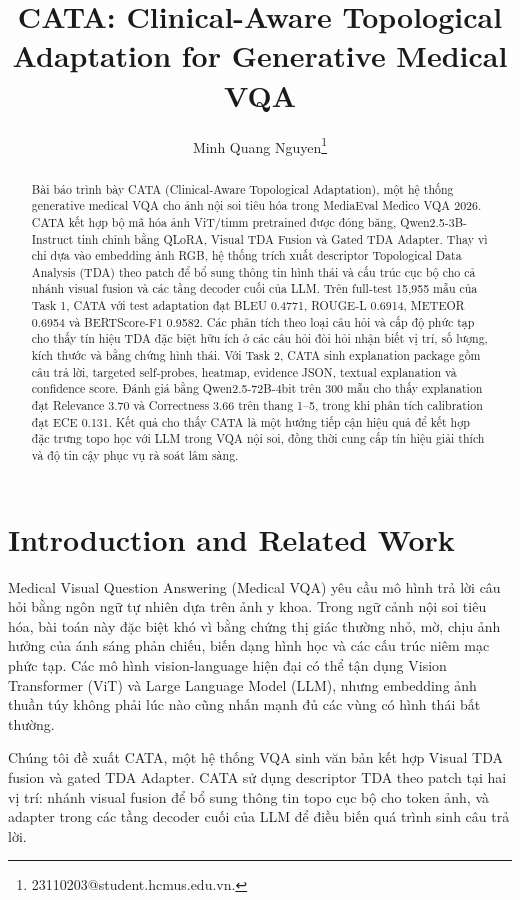 \documentclass[11pt,a4paper]{article}
\title{CATA: Clinical-Aware Topological Adaptation for Generative Medical VQA}
\author[1,2]{Minh Quang Nguyen\thanks{23110203@student.hcmus.edu.vn.}}
\affil[1]{University of Science, VNU-HCM}
\affil[2]{Vietnam National University, Ho Chi Minh City, Vietnam}
\date{}
\begin{document}
\maketitle
\setlength{\parindent}{0pt}

\begin{abstract}
Bài báo trình bày CATA (Clinical-Aware Topological Adaptation), một hệ thống generative medical VQA cho ảnh nội soi tiêu hóa trong MediaEval Medico VQA 2026. CATA kết hợp bộ mã hóa ảnh ViT/timm pretrained được đóng băng, Qwen2.5-3B-Instruct tinh chỉnh bằng QLoRA, Visual TDA Fusion và Gated TDA Adapter. Thay vì chỉ dựa vào embedding ảnh RGB, hệ thống trích xuất descriptor Topological Data Analysis (TDA) theo patch để bổ sung thông tin hình thái và cấu trúc cục bộ cho cả nhánh visual fusion và các tầng decoder cuối của LLM. Trên full-test 15,955 mẫu của Task 1, CATA với test adaptation đạt BLEU 0.4771, ROUGE-L 0.6914, METEOR 0.6954 và BERTScore-F1 0.9582. Các phân tích theo loại câu hỏi và cấp độ phức tạp cho thấy tín hiệu TDA đặc biệt hữu ích ở các câu hỏi đòi hỏi nhận biết vị trí, số lượng, kích thước và bằng chứng hình thái. Với Task 2, CATA sinh explanation package gồm câu trả lời, targeted self-probes, heatmap, evidence JSON, textual explanation và confidence score. Đánh giá bằng Qwen2.5-72B-4bit trên 300 mẫu cho thấy explanation đạt Relevance 3.70 và Correctness 3.66 trên thang 1--5, trong khi phân tích calibration đạt ECE 0.131. Kết quả cho thấy CATA là một hướng tiếp cận hiệu quả để kết hợp đặc trưng topo học với LLM trong VQA nội soi, đồng thời cung cấp tín hiệu giải thích và độ tin cậy phục vụ rà soát lâm sàng.
\end{abstract}

\section{Introduction and Related Work}

Medical Visual Question Answering (Medical VQA) yêu cầu mô hình trả lời câu hỏi bằng ngôn ngữ tự nhiên dựa trên ảnh y khoa. Trong ngữ cảnh nội soi tiêu hóa, bài toán này đặc biệt khó vì bằng chứng thị giác thường nhỏ, mờ, chịu ảnh hưởng của ánh sáng phản chiếu, biến dạng hình học và các cấu trúc niêm mạc phức tạp. Các mô hình vision-language hiện đại có thể tận dụng Vision Transformer (ViT) và Large Language Model (LLM), nhưng embedding ảnh thuần túy không phải lúc nào cũng nhấn mạnh đủ các vùng có hình thái bất thường.

Chúng tôi đề xuất CATA, một hệ thống VQA sinh văn bản kết hợp Visual TDA fusion và gated TDA Adapter. CATA sử dụng descriptor TDA theo patch tại hai vị trí: nhánh visual fusion để bổ sung thông tin topo cục bộ cho token ảnh, và adapter trong các tầng decoder cuối của LLM để điều biến quá trình sinh câu trả lời.
\end{document}
